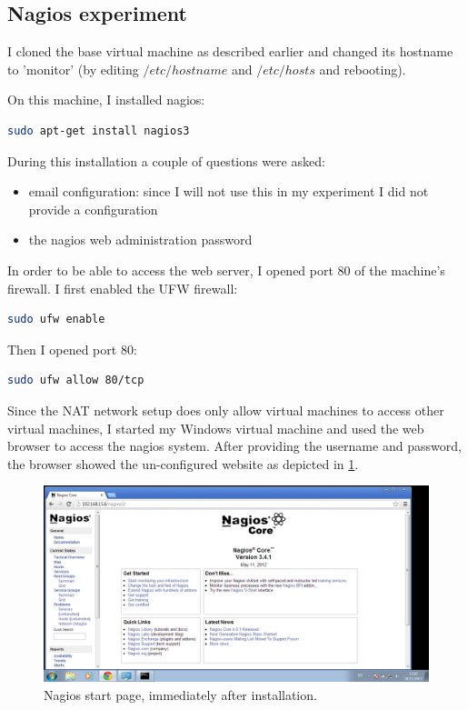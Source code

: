 \documentclass[12pt]{report}
\begin{document}
\subsection{Nagios experiment}
I cloned the base virtual machine as described earlier and changed its
hostname to 'monitor' (by editing $/etc/hostname$ and $/etc/hosts$ and
rebooting).

On this machine, I installed nagios:
\begin{lstlisting}[language=bash]
 sudo apt-get install nagios3
\end{lstlisting}
During this installation a couple of questions were asked:
\begin{itemize}
\item email configuration: since I will not use this in my experiment
  I did not provide a configuration 
\item the nagios web administration password
\end{itemize}
In order to be able to access the web server, I opened port 80 of the
machine's firewall. 
I first enabled the UFW firewall:
\begin{lstlisting}[language=bash]
  sudo ufw enable
\end{lstlisting} 
Then I opened port 80:
\begin{lstlisting}[language=bash]
  sudo ufw allow 80/tcp
\end{lstlisting} 
Since the NAT network setup does only allow virtual machines to access
other virtual machines, I started my Windows virtual machine and used
the web browser to access the nagios system. After providing the
username and password, the browser showed the un-configured website as
depicted in \cref{fig:nagios_1}.

\begin{figure}[h!]
  \caption{Nagios start page, immediately after installation.}
  \label{fig:nagios_1}
  \centering
    \includegraphics[scale=0.3]{pics/nagios_1.png}
\end{figure}
\end{document}
